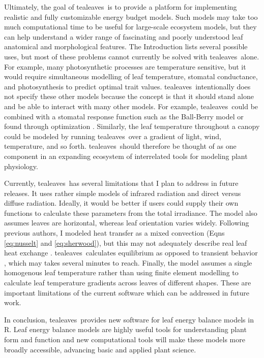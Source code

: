 \documentclass[11pt, oneside]{article}
\newcommand{\pkg}[1]{{\fontseries{b}\selectfont #1}}
\newcommand{\tealeaves}{\pkg{tealeaves}}
\begin{document}
Ultimately, the goal of \tealeaves~is to provide a platform for implementing realistic and fully customizable energy budget models. Such models may take too much computational time to be useful for large-scale ecosystem models, but they can help understand a wider range of fascinating and poorly understood leaf anatomical and morphological features. The Introduction lists several possible uses, but most of these problems cannot currently be solved with \tealeaves~alone. For example, many photosynthetic processes are temperature sensitive, but it would require simultaneous modelling of leaf temperature, stomatal conductance, and photosynthesis to predict optimal trait values. \tealeaves~intentionally does not specify these other models because the concept is that it should stand alone and be able to interact with many other models. For example, \tealeaves~could be combined with a stomatal response function such as the Ball-Berry model \citep{Ball_etal_1987} or found through optimization \citep{Buckley_etal_2014, Duursma_2015, Muir_2019c}. Similarly, the leaf temperature throughout a canopy could be modeled by running \tealeaves~over a gradient of light, wind, temperature, and so forth. \tealeaves~should therefore be thought of as one component in an expanding ecosystem of interrelated tools for modeling plant physiology.

Currently, \tealeaves~has several limitations that I plan to address in future releases. It uses rather simple models of infrared radiation and direct versus diffuse radiation. Ideally, it would be better if users could supply their own functions to calculate these parameters from the total irradiance. The model also assumes leaves are horizontal, whereas leaf orientation varies widely. Following previous authors, I modeled heat transfer as a mixed convection (Eqns \ref{eq:nusselt} and \ref{eq:sherwood}), but this may not adequately describe real leaf heat exchange \citep{Roth-Nebelsick_2001}. \tealeaves~calculates equilibrium as opposed to transient behavior \citep{Vialet-Chabrand_Lawson_2019}, which may takes several minutes to reach. Finally, the model assumes a single homogenous leaf temperature rather than using finite element modelling to calculate leaf temperature gradients across leaves of different shapes. These are important limitations of the current software which can be addressed in future work.

In conclusion, \tealeaves~provides new software for leaf energy balance models in R. Leaf energy balance models are highly useful tools for understanding plant form and function and new computational tools will make these models more broadly accessible, advancing basic and applied plant science.
\end{document}
